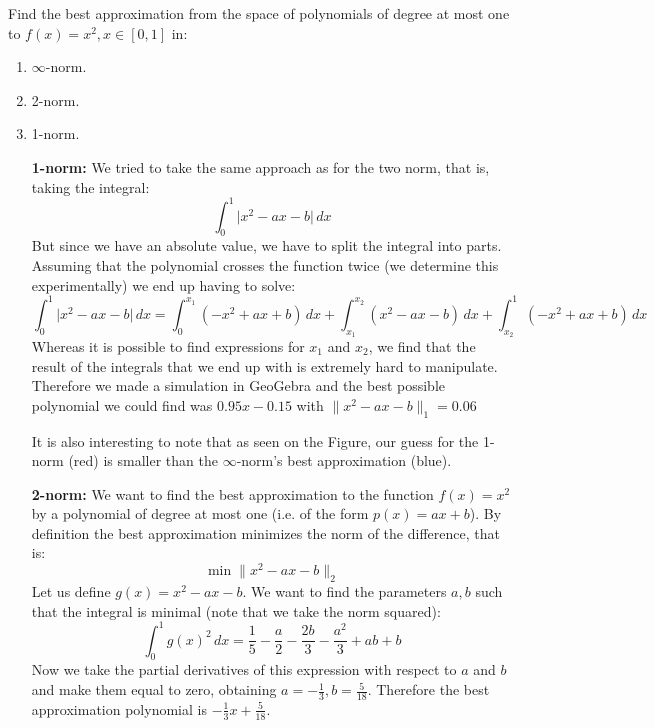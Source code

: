 \begin{problem}
Find the best approximation from the space of polynomials of degree at
most one to $f(x) = x^2 , x \in [0 , 1]$ in:
\begin{enumerate}
\item $\infty$-norm.
\item 2-norm.
\item 1-norm.
\end{enumerate}
\end{problem}

\begin{solution}
  \begin{enumerate}
  \item [{\bf 1-norm: }] We tried to take the same approach as for the
    two norm, that is, taking the integral:
    \begin{equation*}
      \int_0^1 \lvert x^2-ax-b \rvert \, dx
    \end{equation*}
    But since we have an absolute value, we have to split the integral
    into parts. Assuming that the polynomial crosses the function
    twice (we determine this experimentally) we end up having to
    solve:
    \begin{equation*}
      \int_0^1 \lvert x^2-ax-b \rvert \, dx = \int_0^{x_1} (-x^2+ax+b)
      \, dx + \int_{x_1}^{x_2} (x^2-ax-b) \, dx+ \int_{x_2}^1
      (-x^2+ax+b) \, dx
    \end{equation*}
    Whereas it is possible to find expressions for $x_1$ and $x_2$, we
    find that the result of the integrals that we end up with is
    extremely hard to manipulate. Therefore we made a simulation in
    GeoGebra and the best possible polynomial we could find was
    $0.95x-0.15$ with $\lVert x^2-ax-b \rVert_1 = 0.06$

    It is also interesting to note that as seen on the Figure, our
    guess for the 1-norm (red) is smaller than the $\infty$-norm's
    best approximation (blue).

  \item[{\bf 2-norm: }] We want to find the best approximation to the
    function $f(x) = x^2$ by a polynomial of degree at most one
    (i.e. of the form $p(x) = ax+b$). By definition the best
    approximation minimizes the norm of the difference, that is:
    \begin{equation*}
      \min \lVert x^2-ax-b \rVert_2
    \end{equation*}
    Let us define $g(x) = x^2-ax-b$. We want to find the parameters
    $a, b$ such that the integral is minimal (note that we take the
    norm squared):
    \begin{equation*}
      \int_0^1 g(x)^2 \, dx = \frac{1}{5} - \frac{a}{2} - \frac{2b}{3}
      - \frac{a^2}{3} + ab+b
    \end{equation*}
    Now we take the partial derivatives of this expression with
    respect to $a$ and $b$ and make them equal to zero, obtaining $a =
    -\frac{1}{3}, b = \frac{5}{18}$. Therefore the best approximation
    polynomial is $-\frac{1}{3}x + \frac{5}{18}$.
    

\end{enumerate}
\end{solution}
